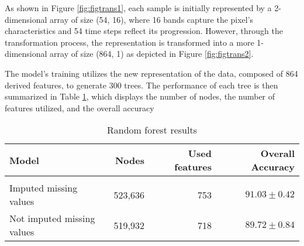 As shown in Figure \ref{fig:figtrans1}, each sample is initially represented by a 2-dimensional array of size (54, 16), where 16 bands capture the pixel's characteristics and 54 time steps reflect its progression. 
However, through the transformation process, the representation is transformed into a more 1-dimensional array of size (864, 1) as depicted in Figure \ref{fig:figtrans2}. 

The model's training utilizes the new representation of the data, composed of 864 derived features, to generate 300 trees.
The performance of each tree is then summarized in Table \ref{tab:rfresults}, which displays the number of nodes, the number of features utilized, and the overall accuracy

\begin{table}[!htbp]
  \centering
    \begin{tabular}{lrrr}
    Model                       & Nodes   & Used features & Overall Accuracy             \\[0.2cm] 
    \hline \\[-0.2cm]
    Imputed missing values      & 523,636  & 753          & $91.03 \pm 0.42$\\
    Not imputed missing values  & 519,932  & 718          & $89.72 \pm 0.84$
    \end{tabular}
  \caption{Random forest results}
  \label{tab:rfresults}
\end{table}